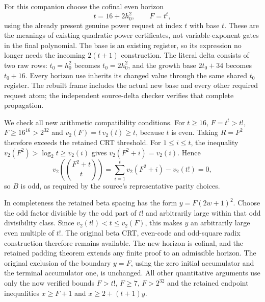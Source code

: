 For this companion choose the cofinal even horizon
\begin{equation}\label{eq:power-horizon}
 t=16+2h_0^2,\qquad F=t^t,
\end{equation}
using the already present genuine power request at index $t$ with base
$t$. These are the meanings of existing quadratic power certificates,
not variable-exponent gates in the final polynomial. The base is an
existing register, so its expression no longer needs the incoming
$2(t+1)$ construction. The literal delta consists of two raw rows: $t_0=h_0^2$ becomes
$t_0=2h_0^2$, and the growth base $2t_0+34$ becomes $t_0+16$.
Every horizon use inherits its changed value through the same shared
$t_0$ register. The rebuilt frame includes the actual new base and every
other required request atom; the independent source-delta checker verifies
that complete propagation.

We check all new arithmetic compatibility conditions. For $t\ge16$,
$F=t^t>t!$, $F\ge16^{16}>2^{32}$ and
$v_2(F)=t\,v_2(t)\ge t$, because $t$ is even.
Taking $R=F^2$ therefore exceeds the retained CRT threshold.
For $1\le i\le t$, the inequality
$v_2(F^2)>\log_2t\ge v_2(i)$ gives
$v_2(F^2+i)=v_2(i)$. Hence
\[
 v_2\!\left(\binom{F^2+t}{t}\right)
 =\sum_{i=1}^t v_2(F^2+i)-v_2(t!)=0,
\]
so $B$ is odd, as required by the source's representative parity choices.

In completeness the retained beta spacing has the form
$y=F(2w+1)^2$. Choose the odd factor divisible by the odd part of $t!$
and arbitrarily large within that odd divisibility class. Since
$v_2(t!)<t\le v_2(F)$, this makes $y$ an arbitrarily large even
multiple of $t!$. The original beta CRT, even-code and odd-square radix
construction therefore remains available. The new horizon is cofinal,
and the retained padding theorem extends any finite proof to an admissible
horizon. The original exclusion of the boundary $y=F$, using the zero
initial accumulator and the terminal accumulator one, is unchanged.
All other quantitative arguments use only the now verified bounds
$F>t!$, $F\ge7$, $F>2^{32}$ and the retained endpoint inequalities
$x\ge F+1$ and $x\ge2+(t+1)y$.

